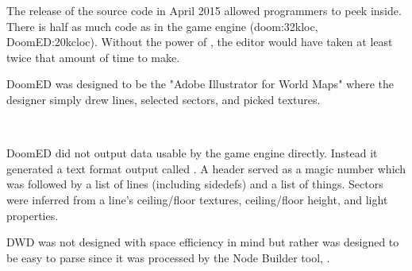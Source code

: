 The release of the source code in April 2015 allowed programmers to peek inside. There is half as much code as in the game engine (doom:32kloc, DoomED:20kcloc). Without the power of \NeXTns, the editor would have taken at least twice that amount of time to make.



\par
DoomED was designed to be the "Adobe Illustrator for World Maps" where the designer simply drew lines, selected sectors, and picked textures.\\
\par
\vspace{10pt}
\\
\par
{}


\vspace{-4mm}
DoomED did not output data usable by the game engine directly. Instead it generated a text format output called . A header served as a magic number which was followed by a list of lines (including sidedefs) and a list of things. Sectors were inferred from a line's ceiling/floor textures, ceiling/floor height, and light properties.\\
\par
{}
\par
DWD was not designed with space efficiency in mind but rather was designed to be easy to parse since it was processed by the Node Builder tool, .\\
\par
{}
\par

\pagebreak





